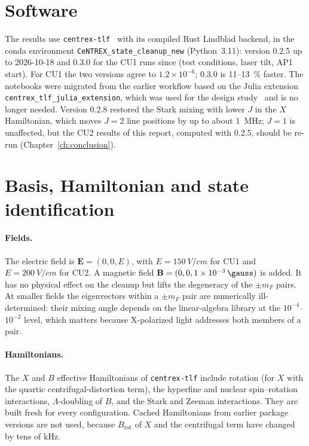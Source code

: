 \documentclass[11pt,a4paper,oneside]{report}
\newcommand{\code}[1]{\texttt{#1}}
\begin{document}
\section{Software}

The results use \code{centrex-tlf}~\cite{centrextlf} with its compiled Rust Lindblad backend, in
the conda environment \code{CeNTREX\_state\_cleanup\_new} (Python~3.11): version 0.2.5 up to
2026-10-18 and 0.3.0 for the CU1 runs since (test conditions, laser tilt, AP1 start). For CU1 the
two versions agree to $1.2\times10^{-6}$; 0.3.0 is 11--\SI{13}{\percent} faster. The notebooks were
migrated from the earlier workflow based on the Julia extension \code{centrex\_tlf\_julia\_extension},
which was used for the design study~\cite{CleanupTheory2024} and is no longer needed.
Version 0.2.8 restored the Stark mixing with lower $J$ in the $X$ Hamiltonian, which moves $J=2$
line positions by up to about \SI{1}{MHz}; $J=1$ is unaffected, but the CU2 results of this report,
computed with 0.2.5, should be re-run (Chapter~\ref{ch:conclusion}).

\section{Basis, Hamiltonian and state identification}
\label{sec:basis}

\paragraph{Fields.} The electric field is $\mathbf E=(0,0,E)$, with $E=\SI{150}{V/cm}$ for
CU1 and $E=\SI{200}{V/cm}$ for CU2. A magnetic field $\mathbf B=(0,0,\SI{1e-3}{\gauss})$ is
added. It has no physical effect on the cleanup but lifts the degeneracy of the $\pm m_F$
pairs. At smaller fields the eigenvectors within a $\pm m_F$ pair are numerically
ill-determined: their mixing angle depends on the linear-algebra library at the
$10^{-4}$--$10^{-2}$ level, which matters because X-polarized light addresses both members of
a pair.

\paragraph{Hamiltonians.} The $X$ and $B$ effective Hamiltonians of \code{centrex-tlf}
include rotation (for $X$ with the quartic centrifugal-distortion term), the hyperfine and
nuclear spin--rotation interactions, $\Lambda$-doubling of $B$, and the Stark and Zeeman
interactions. They are built fresh for every configuration. Cached Hamiltonians from
earlier package versions are not used, because $B_{\mathrm{rot}}$ of $X$ and the
centrifugal term have changed by tens of kHz.
\end{document}
